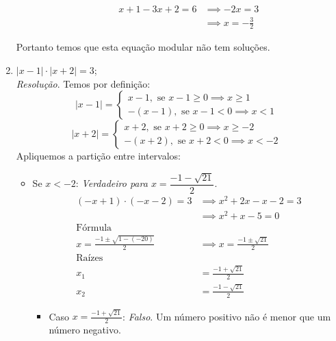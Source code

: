 \begin{enumerate}
\begin{itemize}
        \begin{align*}
            x + 1 -3x + 2 = 6 & \implies -2x = 3 \\ & \implies x = -\frac{3}{2}
        \end{align*}
    \end{itemize}
    Portanto temos que esta equação modular não tem soluções.
    \item $|x - 1| \cdot |x + 2|  = 3$;
    \\ \emph{Resolução}. Temos por definição:
    \begin{displaymath}
        |x - 1| = \left\{\begin{array}{cc}
             x - 1, \text{ se } x - 1 \ge 0 \implies x \ge 1 &  \\
             -(x-1), \text{ se } x - 1 < 0 \implies x < 1& 
        \end{array} \right.
    \end{displaymath}
    \begin{displaymath}
        |x+2| = \left\{\begin{array}{cc}
             x+2, \text{ se } x + 2 \ge 0 \implies x \ge -2&  \\
             -(x+2), \text{ se } x + 2 < 0 \implies x < -2& 
        \end{array} \right.
    \end{displaymath}
    Apliquemos a partição entre intervalos:
    \begin{itemize}
        \item Se $x < -2$: \emph{Verdadeiro para $x = \dfrac{-1 - \sqrt{21}}{2}$}.
        \begin{align*}
            (-x + 1) \cdot (-x -2) = 3 & \implies x^2 + 2x - x -2 = 3 \\ & \implies
            x^2 + x - 5 = 0
            \\ \text{Fórmula} \\
            x = \frac{-1 \pm \sqrt{1 - (-20)}}{2} & \implies x = \frac{-1 \pm \sqrt{21}}{2}
            \\ \text{Raízes} \\
            x_1 & = \frac{-1 + \sqrt{21}}{2} \\
            x_2 & = \frac{-1 - \sqrt{21}}{2}
        \end{align*}
        \begin{itemize}
            \item Caso $x = \frac{-1 + \sqrt{21}}{2}$: \emph{Falso}. Um número positivo não é menor que um número negativo.
            \begin{align*}

\end{align*}
\end{itemize}
\end{itemize}
\end{enumerate}
